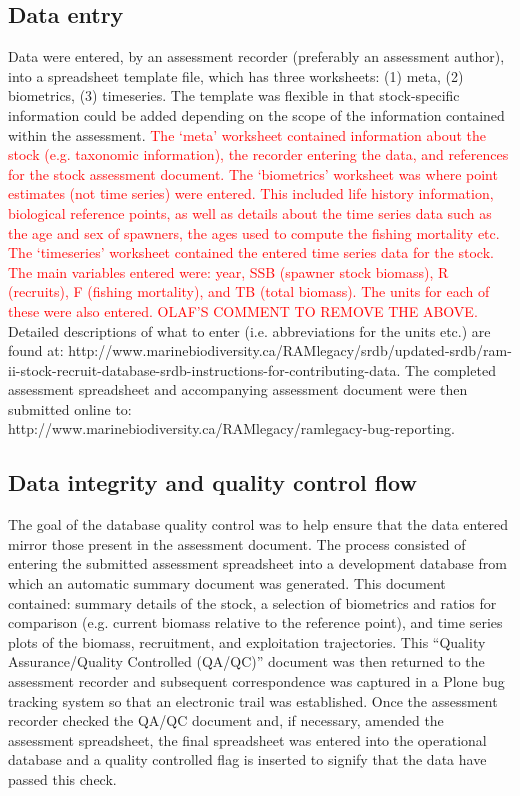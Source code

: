 \documentclass[letterpaper,12pt]{article}
\begin{document}
\subsection{Data entry}
Data were entered, by an assessment recorder (preferably an assessment
author), into a spreadsheet template file, which has three worksheets:
(1) meta, (2) biometrics, (3) timeseries. The template was flexible in
that stock-specific information could be added depending on the scope of
the information contained within the assessment. \textcolor{red}{The `meta' worksheet
contained information about the stock (e.g. taxonomic information), the
recorder entering the data, and references for the stock assessment
document. The `biometrics' worksheet was where point estimates (not
time series) were entered. This included life history information,
biological reference points, as well as details about the time series
data such as the age and sex of spawners, the ages used to compute the
fishing mortality etc. The `timeseries' worksheet contained the entered time series
data for the stock. The main variables entered were: year, SSB (spawner stock biomass), R (recruits), F
(fishing mortality), and TB (total biomass). The units for each of
these were also entered. OLAF'S COMMENT TO REMOVE THE ABOVE.}  Detailed descriptions of what to enter (i.e.
abbreviations for the units etc.) are found at:
http://www.marinebiodiversity.ca/RAMlegacy/srdb/updated-srdb/ram-ii-stock-recruit-database-srdb-instructions-for-contributing-data.
 The completed assessment spreadsheet and accompanying assessment
document were then submitted online to:\\
http://www.marinebiodiversity.ca/RAMlegacy/ramlegacy-bug-reporting.


\subsection{Data integrity and quality control flow}
The goal of the database quality control was to help ensure that the data entered
mirror those present in the assessment document. The process consisted
of entering the submitted assessment spreadsheet into a development
database from which an automatic summary document was generated. This document contained: summary details of the stock,
a selection of biometrics and ratios for comparison (e.g. current
biomass relative to the reference point), and time series plots of the
biomass, recruitment, and exploitation trajectories. This ``Quality
Assurance/Quality Controlled (QA/QC)'' document was then returned to
the assessment recorder and subsequent correspondence was captured in a
Plone bug tracking system so that an electronic trail was established.
Once the assessment recorder checked the QA/QC document and, if
necessary, amended the assessment spreadsheet, the final spreadsheet
was entered into the operational database and a quality controlled
flag is inserted to signify that the data have passed this check.
 
\end{document}
